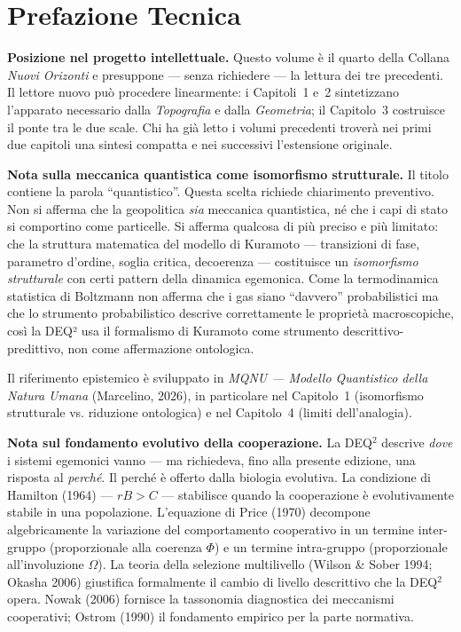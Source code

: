 \documentclass[12pt, twoside]{book}
\theoremstyle{plain}
\theoremstyle{definition}
\theoremstyle{remark}
\begin{document}
\tableofcontents
\cleardoublepage

\chapter*{Prefazione Tecnica}

\textbf{Posizione nel progetto intellettuale.}
Questo volume è il quarto della Collana \textit{Nuovi Orizonti} e presuppone — senza richiedere — la lettura dei tre precedenti. Il lettore nuovo può procedere linearmente: i Capitoli~1 e~2 sintetizzano l'apparato necessario dalla \textit{Topografia} e dalla \textit{Geometria}; il Capitolo~3 costruisce il ponte tra le due scale. Chi ha già letto i volumi precedenti troverà nei primi due capitoli una sintesi compatta e nei successivi l'estensione originale.

\textbf{Nota sulla meccanica quantistica come isomorfismo strutturale.}
Il titolo contiene la parola ``quantistico''. Questa scelta richiede chiarimento preventivo. Non si afferma che la geopolitica \textit{sia} meccanica quantistica, né che i capi di stato si comportino come particelle. Si afferma qualcosa di più preciso e più limitato: che la struttura matematica del modello di Kuramoto — transizioni di fase, parametro d'ordine, soglia critica, decoerenza — costituisce un \textit{isomorfismo strutturale} con certi pattern della dinamica egemonica. Come la termodinamica statistica di Boltzmann non afferma che i gas siano ``davvero'' probabilistici ma che lo strumento probabilistico descrive correttamente le proprietà macroscopiche, così la DEQ² usa il formalismo di Kuramoto come strumento descrittivo-predittivo, non come affermazione ontologica.

Il riferimento epistemico è sviluppato in \textit{MQNU — Modello Quantistico della Natura Umana} (Marcelino, 2026), in particolare nel Capitolo~1 (isomorfismo strutturale vs. riduzione ontologica) e nel Capitolo~4 (limiti dell'analogia).

\textbf{Nota sul fondamento evolutivo della cooperazione.}
La DEQ$^2$ descrive \textit{dove} i sistemi egemonici vanno --- ma richiedeva, fino alla presente edizione, una risposta al \textit{perché}. Il perché è offerto dalla biologia evolutiva. La condizione di Hamilton (1964) --- $rB > C$ --- stabilisce quando la cooperazione è evolutivamente stabile in una popolazione. L'equazione di Price (1970) decompone algebricamente la variazione del comportamento cooperativo in un termine inter-gruppo (proporzionale alla coerenza $\Phi$) e un termine intra-gruppo (proporzionale all'involuzione $\Omega$). La teoria della selezione multilivello (Wilson \& Sober 1994; Okasha 2006) giustifica formalmente il cambio di livello descrittivo che la DEQ$^2$ opera. Nowak (2006) fornisce la tassonomia diagnostica dei meccanismi cooperativi; Ostrom (1990) il fondamento empirico per la parte normativa.
\end{document}
